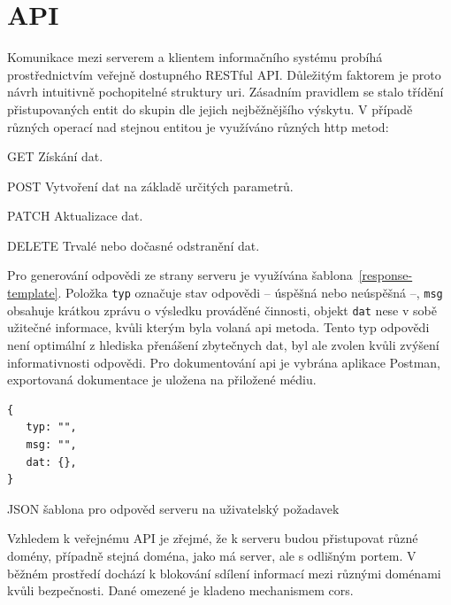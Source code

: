 

\section{API}

Komunikace mezi serverem a klientem informačního systému probíhá prostřednictvím veřejně dostupného RESTful API. Důležitým faktorem je proto návrh intuitivně pochopitelné struktury \gls{uri}. Zásadním pravidlem se stalo třídění přistupovaných entit do skupin dle jejich nejběžnějšího výskytu. V případě různých operací nad stejnou entitou je využíváno různých \gls{http} metod:
\begin{dlnar}
   \item [GET] Získání dat.
   \item [POST] Vytvoření dat na základě určitých parametrů.
   \item [PATCH] Aktualizace dat.
   \item [DELETE] Trvalé nebo dočasné odstranění dat.
\end{dlnar}


Pro generování odpovědi ze strany serveru je využívána šablona~\ref{response-template}. Položka \texttt{typ} označuje stav odpovědi -- úspěšná nebo neúspěšná --, \texttt{msg} obsahuje krátkou zprávu o výsledku prováděné činnosti, objekt \texttt{dat} nese v sobě užitečné informace, kvůli kterým byla volaná \gls{api} metoda. Tento typ odpovědi není optimální z hlediska přenášení zbytečnych dat, byl ale zvolen kvůli zvýšení informativnosti odpovědi. Pro dokumentování \gls{api} je vybrána aplikace Postman, exportovaná dokumentace je uložena na přiložené médiu.


\begin{fig:code}
   \begin{verbatim}   
{
   typ: "",
   msg: "",
   dat: {},
}
   \end{verbatim}
   \caption{JSON šablona pro odpověd serveru na uživatelský požadavek}\label{response-template}
\end{fig:code}



Vzhledem k veřejnému API je zřejmé, že k serveru budou přistupovat různé domény, případně stejná doména, jako má server, ale s odlišným portem. V běžném prostředí dochází k blokování sdílení informací mezi různými doménami kvůli bezpečnosti. Dané omezené je kladeno mechanismem \gls{cors}.~\cite{corsActions}

